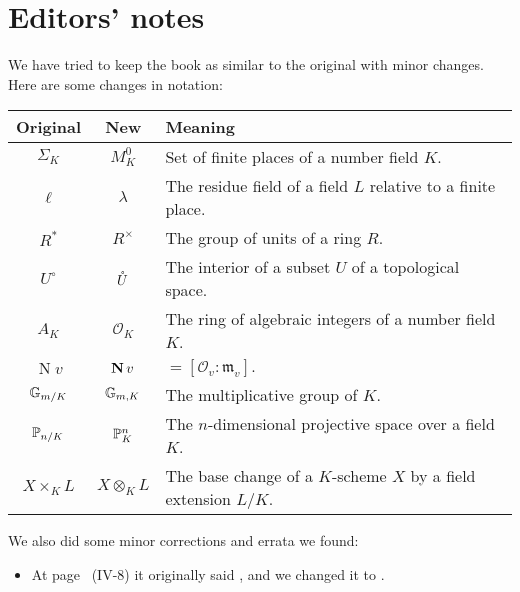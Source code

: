 \chapter*{Editors' notes}
We have tried to keep the book as similar to the original with minor changes.
Here are some changes in notation:
\begin{longtable}{|c|c|p{9cm}|}
	\hline
	\textbf{Original} & \textbf{New} & \textbf{Meaning} \\
	\hline
	\endhead

	\hline
	\endfoot

	$\Sigma_K$ & $M_K^0$ & Set of finite places of a number field $K$. \\
	$\ell$ & $\lambda$ & The residue field of a field $L$ relative to a finite place. \\
	$R^*$ & $R^\times$ & The group of units of a ring $R$. \\
	$U^\circ$ & $\mathring{U}$ & The interior of a subset $U$ of a topological space. \\
	$A_K$ & $\mathcal{O}_K$ & The ring of algebraic integers of a number field $K$. \\
	$\operatorname{N} v$ & $\operatorname{\mathbf{N}} v$ & ${} = [\mathcal{O}_v : \mathfrak{m}_v].$ \\
	$\mathbb{G}_{m/K}$ & $\mathbb{G}_{m, K}$ & The multiplicative group of $K$. \\
	$\mathbb{P}_{n/K}$ & $\mathbb{P}^n_K$ & The $n$-dimensional projective space over a field $K$. \\
	$X \times_K L$ & $X \otimes_K L$ & The base change of a $K$-scheme $X$ by a field extension $L/K$. \\
\end{longtable}

We also did some minor corrections and errata we found:
\begin{itemize}
\item At page~\pageref{errata:uv12} (IV-8) it originally said
	, and we changed it to
	.
\end{itemize}
